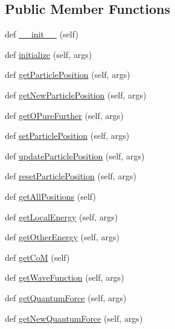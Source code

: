 \subsection*{Public Member Functions}
\begin{DoxyCompactItemize}
\item 
def \hyperlink{classMontePython__cxx_1_1Walker_ad3daca86b0cf391e55059f86c60cc0cc}{\+\_\+\+\_\+init\+\_\+\+\_\+} (self)
\item 
def \hyperlink{classMontePython__cxx_1_1Walker_af97a7b9553c3cea8a16cb930d85d16b4}{initialize} (self, args)
\item 
def \hyperlink{classMontePython__cxx_1_1Walker_a42e91613e3cd0e2a19863123dd2ad347}{get\+Particle\+Position} (self, args)
\item 
def \hyperlink{classMontePython__cxx_1_1Walker_a7752974e408fa2687f73a6499eda3013}{get\+New\+Particle\+Position} (self, args)
\item 
def \hyperlink{classMontePython__cxx_1_1Walker_a6c02acf6810fe1067cfe038bb1d56877}{get\+O\+Pure\+Further} (self, args)
\item 
def \hyperlink{classMontePython__cxx_1_1Walker_a89edefc80e92191dbc5b47638044e601}{set\+Particle\+Position} (self, args)
\item 
def \hyperlink{classMontePython__cxx_1_1Walker_abcf346007ae8b087c4ee39ce89124494}{update\+Particle\+Position} (self, args)
\item 
def \hyperlink{classMontePython__cxx_1_1Walker_ae46c06947cdbdd9c13c7374a03972436}{reset\+Particle\+Position} (self, args)
\item 
def \hyperlink{classMontePython__cxx_1_1Walker_a1aab17b1267eadcc195d338a9b2e549d}{get\+All\+Positions} (self)
\item 
def \hyperlink{classMontePython__cxx_1_1Walker_a8f0138194954673f52dfb978c4759fa0}{get\+Local\+Energy} (self, args)
\item 
def \hyperlink{classMontePython__cxx_1_1Walker_a607ab0de88aa21ab5cb87145d03d1f98}{get\+Other\+Energy} (self, args)
\item 
def \hyperlink{classMontePython__cxx_1_1Walker_a8bf3e5604b6a6c1d08b0da9ce4730206}{get\+Co\+M} (self)
\item 
def \hyperlink{classMontePython__cxx_1_1Walker_a420fbd0641dc1ab586399e16942d2236}{get\+Wave\+Function} (self, args)
\item 
def \hyperlink{classMontePython__cxx_1_1Walker_ad777c902fb42a9f87c98941f7db8d4ad}{get\+Quantum\+Force} (self, args)
\item 
def \hyperlink{classMontePython__cxx_1_1Walker_af752c22bc7078e900025482a02141a85}{get\+New\+Quantum\+Force} (self, args)

\end{DoxyCompactItemize}
